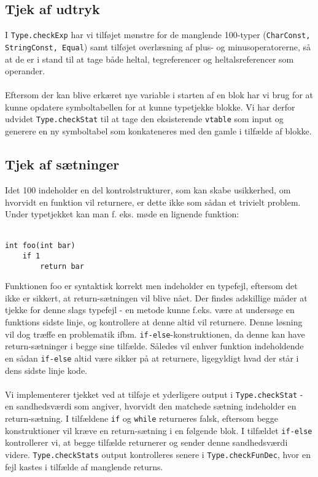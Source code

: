 \documentclass[10pt,a4paper,danish]{article}
\begin{document}
\subsection{Tjek af udtryk}
I \texttt{Type.checkExp} har vi tilføjet mønstre for de manglende 100-typer
 (\texttt{CharConst, StringConst, Equal}) samt tilføjet overlæsning af 
plus- og minusoperatorerne,
så at de er i stand til at tage både heltal, tegreferencer og heltalsreferencer
som operander.  

\paragraph{}
Eftersom der kan blive erkæret nye variable i starten af en blok har vi brug 
for at kunne opdatere symboltabellen for at kunne typetjekke blokke. Vi har
derfor udvidet \texttt{Type.checkStat} til at tage den eksisterende
\texttt{vtable} som input og generere en ny symboltabel som konkateneres
 med den gamle i tilfælde af blokke. 

\subsection{Tjek af sætninger}
Idet 100 indeholder en del kontrolstrukturer, som kan skabe usikkerhed, om 
hvorvidt en funktion vil returnere, er dette ikke som sådan et trivielt problem.
Under typetjekket kan man f. eks. møde en lignende funktion:\\\\

\begin{verbatim}
int foo(int bar)
    if 1
        return bar
\end{verbatim}

Funktionen foo er syntaktisk korrekt men indeholder 
en typefejl, eftersom det ikke er sikkert, at return-sætningen vil
blive nået. Der findes adskillige måder at tjekke for denne slags typefejl -
en metode kunne f.eks. være at undersøge en funktions sidste linje, og 
kontrollere at denne altid vil returnere. Denne løsning vil dog
træffe en problematik ifbm. \texttt{if-else}-konstruktionen, da denne
kan have return-sætninger i begge sine tilfælde. Således  vil enhver
funktion indeholdende en sådan \texttt{if-else}
 altid være sikker på at returnere, 
ligegyldigt hvad der står i dens sidste linje kode.

\paragraph{}
Vi implementerer tjekket ved at tilføje et yderligere output i 
\texttt{Type.checkStat} - 
en sandhedsværdi som angiver, hvorvidt den matchede sætning indeholder
en return-sætning. I tilfældene \texttt{if} og 
\texttt{while} returneres falsk,
eftersom begge konstruktioner vil kræve en return-sætning i en følgende
blok. I tilfældet \texttt{if-else}
 kontrollerer vi, at begge tilfælde returnerer og 
sender denne sandhedsværdi videre. \texttt{Type.checkStats}
 output kontrolleres senere
i \texttt{Type.checkFunDec}, 
hvor en fejl kastes i tilfælde af manglende returns. 
\end{document}
